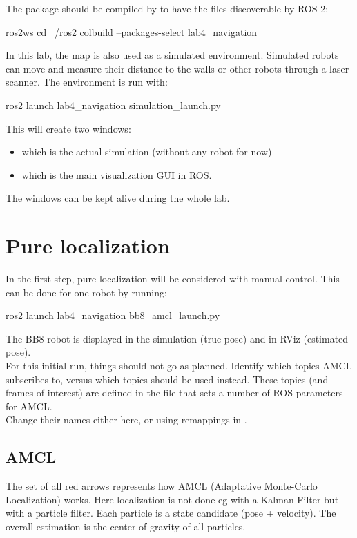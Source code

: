 \documentclass{ecnreport}
\begin{document}
The package should be compiled by  to have the files discoverable by ROS 2:
\begin{bashcodelarge}
 ros2ws
 cd ~/ros2
 colbuild --packages-select lab4_navigation
\end{bashcodelarge}

In this lab, the map is also used as a simulated environment. Simulated robots can move and measure their distance to the walls or other robots through a laser scanner. The environment is run with:
\begin{bashcodelarge}
 ros2 launch lab4_navigation simulation_launch.py 
\end{bashcodelarge}This will create two windows:
\begin{itemize}
 \item {} which is the actual simulation (without any robot for now)
 \item {} which is the main visualization GUI in ROS.
\end{itemize}
The windows can be kept alive during the whole lab.

\newpage

\section{Pure localization}

In the first step, pure localization will be considered with manual control. This can be done for one robot by running:
\begin{bashcodelarge}
 ros2 launch lab4_navigation bb8_amcl_launch.py
\end{bashcodelarge}
The BB8 robot is displayed in the simulation (true pose) and in RViz (estimated pose).\\

For this initial run, things should not go as planned. Identify which topics AMCL subscribes to, versus which topics should be used instead. These topics (and frames of interest) are defined in the file  that sets a number of ROS parameters for AMCL. \\Change their names either here, or using remappings in .

\subsection{AMCL}

The set of all red arrows represents how AMCL (Adaptative Monte-Carlo Localization) works. Here localization is not done eg with a Kalman Filter but with a particle filter. Each particle is a state candidate (pose + velocity). The overall estimation is the center of gravity of all particles.
\end{document}
